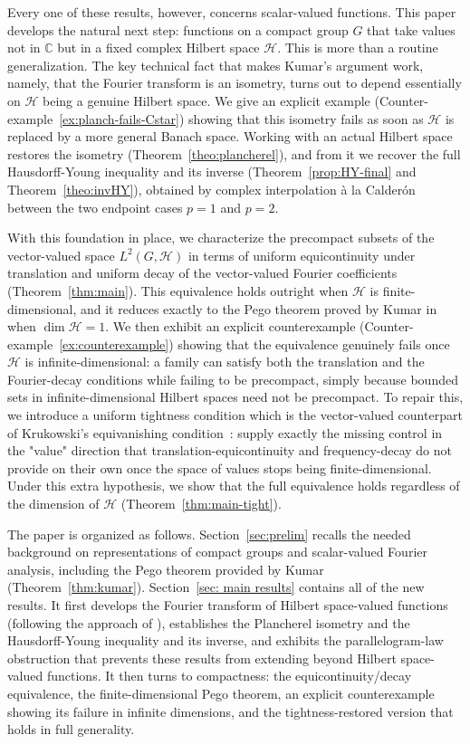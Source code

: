 \documentclass[11pt]{amsart}
\begin{document}
Every one of these results, however, concerns scalar-valued functions. This paper develops the natural next step: functions on a compact group $G$ that take values not in $\mathbb{C}$ but in a fixed complex Hilbert space $\mathcal{H}$. This is more than a routine generalization. The key technical fact that makes Kumar's argument work, namely, that the Fourier transform is an isometry, turns out to depend essentially on $\mathcal{H}$ being a genuine Hilbert space. We give an explicit example (Counter-example~\ref{ex:planch-fails-Cstar}) showing that this isometry fails as soon as $\mathcal{H}$ is replaced by a more general Banach space. Working with an actual Hilbert space restores the isometry (Theorem~\ref{theo:plancherel}), and from it we recover the full Hausdorff-Young inequality and its inverse (Theorem~\ref{prop:HY-final} and Theorem~\ref{theo:invHY}), obtained by complex interpolation \`a la Calder\'on~\cite{BerghLofstrom} between the two endpoint cases $p=1$ and $p=2$.

With this foundation in place, we characterize the precompact subsets of the vector-valued space $L^2(G,\mathcal{H})$ in terms of uniform equicontinuity under translation and uniform decay of the vector-valued Fourier coefficients (Theorem~\ref{thm:main}). This equivalence holds outright when $\mathcal{H}$ is finite-dimensional, and it reduces exactly to the Pego theorem proved by Kumar in \cite{Kumar2024} when $\dim \mathcal{H} = 1$. We then exhibit an explicit counterexample (Counter-example~\ref{ex:counterexample}) showing that the equivalence genuinely fails once $\mathcal{H}$ is infinite-dimensional: a family can satisfy both the translation and the Fourier-decay conditions while failing to be precompact, simply because bounded sets in infinite-dimensional Hilbert spaces need not be precompact. To repair this, we introduce a uniform tightness condition which is the  vector-valued counterpart of Krukowski's equivanishing condition~\cite{Krukowski}:  supply exactly the missing control in the "value" direction that translation-equicontinuity and frequency-decay do not provide on their own once the space of values stops being finite-dimensional. Under this extra hypothesis, we show that the full  equivalence holds regardless of the dimension of $\mathcal{H}$ (Theorem~\ref{thm:main-tight}).

The paper is organized as follows. Section~\ref{sec:prelim} recalls the needed background on representations of compact groups and scalar-valued Fourier analysis,  including  the Pego  theorem provided by Kumar (Theorem~\ref{thm:kumar}). Section~\ref{sec: main results} contains all of the new results. It first develops the Fourier transform of Hilbert space-valued functions (following the approach of \cite{Assiamoua1989}), establishes the Plancherel isometry and the Hausdorff-Young inequality and its inverse, and exhibits the parallelogram-law obstruction that prevents these results from extending beyond Hilbert space-valued functions. It then turns to compactness: the equicontinuity/decay equivalence, the finite-dimensional Pego theorem, an explicit counterexample showing its failure in infinite dimensions, and the tightness-restored version that holds in full generality.
  
\end{document}
